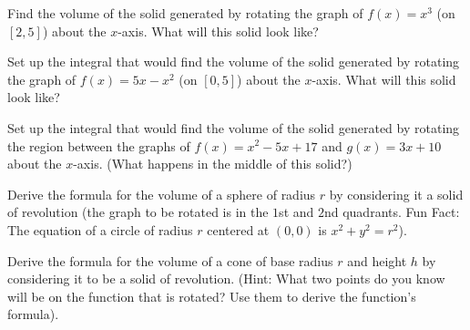 \documentclass{ximera}
\begin{document}
\begin{question} 
Find the volume of the solid generated by rotating the graph of $f(x) = x^3$ (on $[2,5]$) about the $x$-axis.  What will this solid look like?
\end{question}
\begin{question} 
Set up the integral that would find the volume of the solid generated by rotating the graph of $f(x) = 5x-x^2$ (on $[0,5]$) about the $x$-axis.  What will this solid look like?
\end{question}
\begin{question} 
Set up the integral that would find the volume of the solid generated by rotating the region between the graphs of $f(x) = x^2-5x+17$ and $g(x) = 3x+10$ about the $x$-axis. (What happens in the middle of this solid?)
\end{question}
\begin{question} 
Derive the formula for the volume of a sphere of radius $r$ by considering it a solid of revolution (the graph to be rotated is in the $1$st and $2$nd quadrants.  Fun Fact:  The equation of a circle of radius $r$ centered at $(0, 0)$ is  $x^2 + y^2 = r^2$).
\end{question}
\begin{question} 
Derive the formula for the volume of a cone of base radius $r$ and height $h$ by considering it to be a solid of revolution. (Hint:  What two points do you know will be on the function that is rotated?  Use them to derive the function's formula).
\end{question} 
\end{document}
